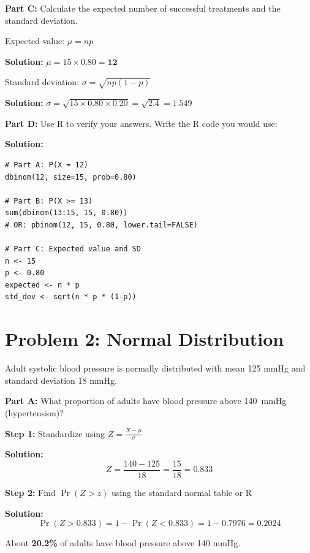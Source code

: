 \documentclass[11pt]{article}
\begin{document}
\vspace{0.5cm}

\textbf{Part C:} Calculate the expected number of successful treatments and the standard deviation.

Expected value: $\mu = np$

\textcolor{correctgreen}{\textbf{Solution:}} $\mu = 15 \times 0.80 = \mathbf{12}$

Standard deviation: $\sigma = \sqrt{np(1-p)}$

\textcolor{correctgreen}{\textbf{Solution:}} $\sigma = \sqrt{15 \times 0.80 \times 0.20} = \sqrt{2.4} = \mathbf{1.549}$

\vspace{0.5cm}

\textbf{Part D:} Use R to verify your answers. Write the R code you would use:

\textcolor{correctgreen}{\textbf{Solution:}}
\begin{verbatim}
# Part A: P(X = 12)
dbinom(12, size=15, prob=0.80)

# Part B: P(X >= 13)
sum(dbinom(13:15, 15, 0.80))
# OR: pbinom(12, 15, 0.80, lower.tail=FALSE)

# Part C: Expected value and SD
n <- 15
p <- 0.80
expected <- n * p
std_dev <- sqrt(n * p * (1-p))
\end{verbatim}

\newpage

\section{Problem 2: Normal Distribution}

Adult systolic blood pressure is normally distributed with mean 125 mmHg and standard deviation 18 mmHg.

\textbf{Part A:} What proportion of adults have blood pressure above 140~mmHg (hypertension)?

\textbf{Step 1:} Standardize using $Z = \frac{X - \mu}{\sigma}$

\textcolor{correctgreen}{\textbf{Solution:}}
$$Z = \frac{140 - 125}{18} = \frac{15}{18} = 0.833$$

\textbf{Step 2:} Find $\Pr(Z > z)$ using the standard normal table or R

\textcolor{correctgreen}{\textbf{Solution:}}
$$\Pr(Z > 0.833) = 1 - \Pr(Z < 0.833) = 1 - 0.7976 = \mathbf{0.2024}$$

About \textbf{20.2\%} of adults have blood pressure above 140 mmHg.
\end{document}
